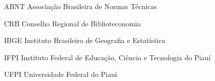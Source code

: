 \begin{siglas}
  \item[ABNT] Associação Brasileira de Normas Técnicas
  \item[CRB] Conselho Regional de Biblioteconomia
  \item[IBGE] Instituto Brasileiro de Geografia e Estatística
  \item[IFPI] Instituto Federal de Educação, Ciência e Tecnologia do Piauí
  \item[UFPI] Universidade Federal do Piauí
\end{siglas}